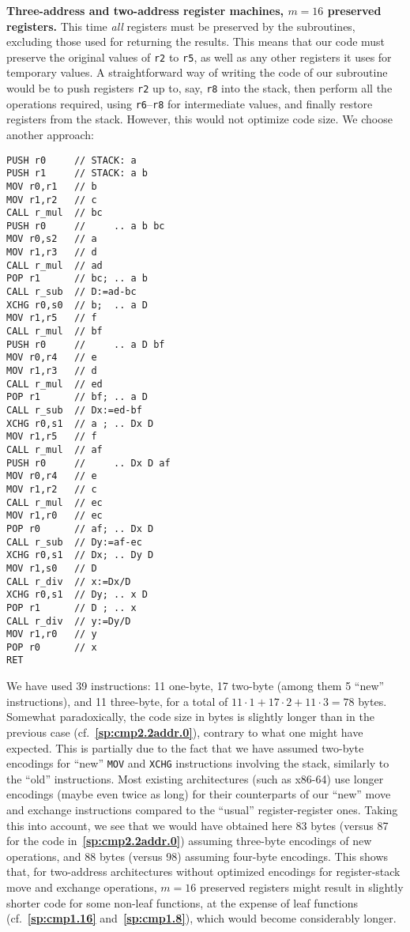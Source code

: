 \documentclass[12pt,oneside]{article}
\def\makepoint#1{\medbreak\noindent{\bf #1.\ }}
\def\nxsubpoint{\refstepcounter{subsubsection}%
  \smallbreak\makepoint{\thesubsubsection}}
\def\refpoint#1{{\rm\textbf{\ref{#1}}}}
\let\ptref=\refpoint
\def\emb#1{\textbf{#1.}}
\begin{document}
\nxsubpoint\label{sp:cmp2.2addr.16}\emb{Three-address and two-address register machines, $m=16$ preserved registers}
This time {\em all\/} registers must be preserved by the subroutines, excluding those used for returning the results. This means that our code must preserve the original values of \texttt{r2} to \texttt{r5}, as well as any other registers it uses for temporary values. A straightforward way of writing the code of our subroutine would be to push registers \texttt{r2} up to, say, \texttt{r8} into the stack, then perform all the operations required, using \texttt{r6}--\texttt{r8} for intermediate values, and finally restore registers from the stack. However, this would not optimize code size. We choose another approach:

\begin{verbatim}
PUSH r0     // STACK: a
PUSH r1     // STACK: a b
MOV r0,r1   // b
MOV r1,r2   // c
CALL r_mul  // bc
PUSH r0     //     .. a b bc
MOV r0,s2   // a
MOV r1,r3   // d
CALL r_mul  // ad
POP r1      // bc; .. a b
CALL r_sub  // D:=ad-bc
XCHG r0,s0  // b;  .. a D
MOV r1,r5   // f
CALL r_mul  // bf
PUSH r0     //     .. a D bf
MOV r0,r4   // e
MOV r1,r3   // d
CALL r_mul  // ed
POP r1      // bf; .. a D
CALL r_sub  // Dx:=ed-bf
XCHG r0,s1  // a ; .. Dx D
MOV r1,r5   // f
CALL r_mul  // af
PUSH r0     //     .. Dx D af
MOV r0,r4   // e
MOV r1,r2   // c
CALL r_mul  // ec
MOV r1,r0   // ec
POP r0      // af; .. Dx D
CALL r_sub  // Dy:=af-ec
XCHG r0,s1  // Dx; .. Dy D
MOV r1,s0   // D
CALL r_div  // x:=Dx/D
XCHG r0,s1  // Dy; .. x D
POP r1      // D ; .. x
CALL r_div  // y:=Dy/D
MOV r1,r0   // y
POP r0      // x
RET
\end{verbatim}
We have used 39 instructions: 11 one-byte, 17 two-byte (among them 5 ``new'' instructions), and 11 three-byte, for a total of $11\cdot1+17\cdot2+11\cdot3=78$ bytes. Somewhat paradoxically, the code size in bytes is slightly longer than in the previous case (cf.~\ptref{sp:cmp2.2addr.0}), contrary to what one might have expected. This is partially due to the fact that we have assumed two-byte encodings for ``new'' \texttt{MOV} and \texttt{XCHG} instructions involving the stack, similarly to the ``old'' instructions. Most existing architectures (such as x86-64) use longer encodings (maybe even twice as long) for their counterparts of our ``new'' move and exchange instructions compared to the ``usual'' register-register ones. Taking this into account, we see that we would have obtained here 83 bytes (versus 87 for the code in~\ptref{sp:cmp2.2addr.0}) assuming three-byte encodings of new operations, and 88 bytes (versus 98) assuming four-byte encodings. This shows that, for two-address architectures without optimized encodings for register-stack move and exchange operations, $m=16$ preserved registers might result in slightly shorter code for some non-leaf functions, at the expense of leaf functions (cf.~\ptref{sp:cmp1.16} and~\ptref{sp:cmp1.8}), which would become considerably longer.
\end{document}
